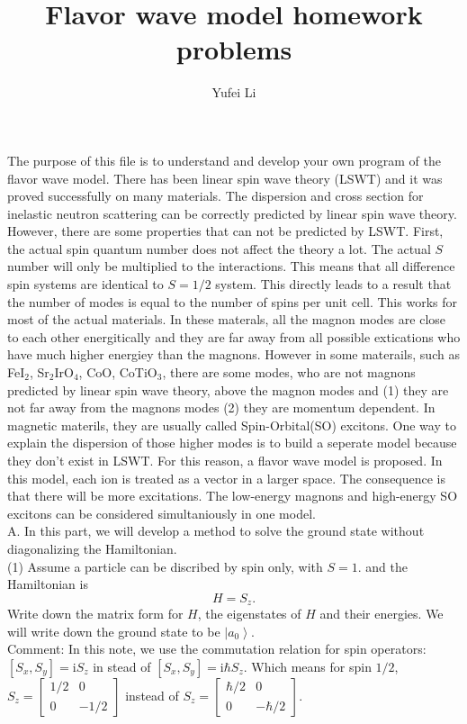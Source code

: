 \documentclass[letterpaper,10pt]{article}
\title{ Flavor wave model homework problems}
\author{Yufei Li}
\newcommand{\ii}{\mathrm{i}}
\begin{document}
\maketitle
The purpose of this file is to understand and develop your own program of the flavor wave model. There has been linear spin wave theory (LSWT) and it was proved successfully on many materials. The dispersion and cross section for inelastic neutron scattering can be correctly predicted by linear spin wave theory. However, there are some properties that can not be predicted by LSWT. First, the actual spin quantum number does not affect the theory a lot. The actual $S$ number will only be multiplied to the interactions. This means that all difference spin systems are identical to $S=1/2$ system. This directly leads to a result that the number of modes is equal to the number of spins per unit cell. This works for most of the actual materials. In these materals, all the magnon modes are close to each other energitically and they are far away from all possible extications who have much higher energiey than the magnons. However in some materails, such as FeI$_2$\cite{Bai2021,FeI2THz}, Sr$_2$IrO$_4$\cite{Kim2014}, CoO\cite{CoO}, CoTiO$_3$\cite{CoTiO3}, there are some modes, who are not magnons predicted by linear spin wave theory, above the magnon modes and (1) they are not far away from the magnons modes (2) they are momentum dependent. In magnetic materils, they are usually called Spin-Orbital(SO) excitons. One way to explain the dispersion of those higher modes is to build a seperate model because they don't exist in LSWT. For this reason, a flavor wave model is proposed. In this model, each ion is treated as a vector in a larger space. The consequence is that there will be more excitations. The low-energy magnons and high-energy SO excitons can be considered simultaniously in one model. \\
{\large{A}}. In this part, we will develop a method to solve the ground state without diagonalizing the Hamiltonian. \\
\indent (1)  Assume a particle can be discribed by spin only, with $S=1$. and the Hamiltonian is 
$$ H= S_z.
$$
Write down the matrix form for $H$, the eigenstates of $H$ and their energies. We will write down the ground state to be $\left|a_0\right>$.\\
\indent Comment: In this note, we use the commutation relation for spin operators: $[S_x,S_y]=\ii S_z$ in stead of $[S_x,S_y]=\ii \hbar S_z$. Which means for spin $1/2$, $S_z=\begin{bmatrix}
    1/2 & 0 \\
    0 &  -1/2
    \end{bmatrix}$ instead of $ S_z=\begin{bmatrix}
        \hbar/2 & 0 \\
        0 &  -\hbar/2
        \end{bmatrix}$. \\
\end{document}
